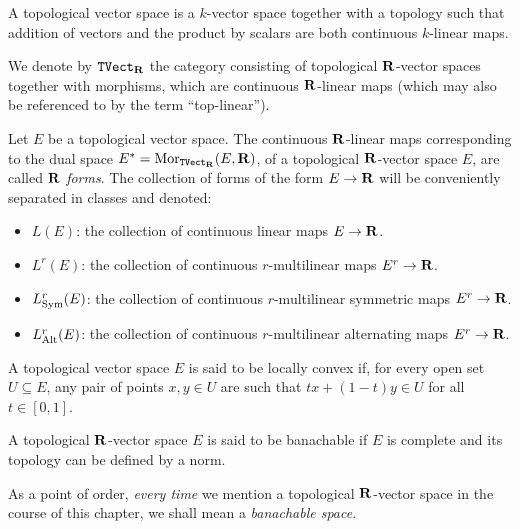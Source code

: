 \begin{definition}
\label{def:topological-vector-space}
A topological vector space is a \(k\)-vector space together with a topology
such that addition of vectors and the product by scalars are both continuous
\(k\)-linear maps.

We denote by \({\texttt{TVect}}_{\mathbf{R}}\) the category consisting of topological
\(\mathbf{R}\)-vector spaces together with morphisms, which are continuous \(\mathbf{R}\)-linear
maps (which may also be referenced to by the term ``top-linear'').

Let \(E\) be a topological vector space. The continuous \(\mathbf{R}\)-linear maps
corresponding to the dual space \(E^{*} = \operatorname{Mor}_{{\texttt{TVect}}_{\mathbf{R}}}(E, \mathbf{R})\), of a
topological \(\mathbf{R}\)-vector space \(E\), are called \(\mathbf{R}\) \emph{forms}. The
collection of forms of the form \(E \to \mathbf{R}\) will be conveniently separated in
classes and denoted:
\begin{itemize}\setlength\itemsep{0em}
\item \(L(E)\): the collection of continuous linear maps \(E \to \mathbf{R}\).
\item \(L^r(E)\): the collection of continuous \(r\)-multilinear maps \(E^r \to \mathbf{R}\).
\item \(L^r_{\operatorname{Sym}}(E)\): the collection of continuous \(r\)-multilinear
  symmetric maps \(E^r \to \mathbf{R}\).
\item \(L^r_{\operatorname{Alt}}(E)\): the collection of continuous \(r\)-multilinear
  alternating maps \(E^r \to \mathbf{R}\).
\end{itemize}
\end{definition}

\begin{definition}
\label{def:locally-convex}
A topological vector space \(E\) is said to be locally convex if, for every open
set \(U \subseteq E\), any pair of points \(x, y \in U\) are such that \(t x +
(1 - t) y \in U\) for all \(t \in [0, 1]\).
\end{definition}

\begin{definition}[Banachable]
\label{def:banachable}
A topological \(\mathbf{R}\)-vector space \(E\) is said to be banachable if \(E\) is
complete and its topology can be defined by a norm.
\end{definition}

As a point of order, \emph{every time} we mention a topological \(\mathbf{R}\)-vector
space in the course of this chapter, we shall mean a \emph{banachable space}.

